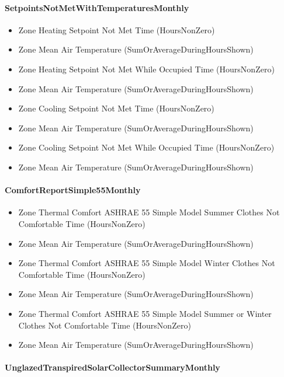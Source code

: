 \paragraph{SetpointsNotMetWithTemperaturesMonthly}\label{setpointsnotmetwithtemperaturesmonthly}

\begin{itemize}
\item
  Zone Heating Setpoint Not Met Time (HoursNonZero)
\item
  Zone Mean Air Temperature (SumOrAverageDuringHoursShown)
\item
  Zone Heating Setpoint Not Met While Occupied Time (HoursNonZero)
\item
  Zone Mean Air Temperature (SumOrAverageDuringHoursShown)
\item
  Zone Cooling Setpoint Not Met Time (HoursNonZero)
\item
  Zone Mean Air Temperature (SumOrAverageDuringHoursShown)
\item
  Zone Cooling Setpoint Not Met While Occupied Time (HoursNonZero)
\item
  Zone Mean Air Temperature (SumOrAverageDuringHoursShown)
\end{itemize}

\paragraph{ComfortReportSimple55Monthly}\label{comfortreportsimple55monthly}

\begin{itemize}
\item
  Zone Thermal Comfort ASHRAE 55 Simple Model Summer Clothes Not Comfortable Time (HoursNonZero)
\item
  Zone Mean Air Temperature (SumOrAverageDuringHoursShown)
\item
  Zone Thermal Comfort ASHRAE 55 Simple Model Winter Clothes Not Comfortable Time (HoursNonZero)
\item
  Zone Mean Air Temperature (SumOrAverageDuringHoursShown)
\item
  Zone Thermal Comfort ASHRAE 55 Simple Model Summer or Winter Clothes Not Comfortable Time (HoursNonZero)
\item
  Zone Mean Air Temperature (SumOrAverageDuringHoursShown)
\end{itemize}

\paragraph{UnglazedTranspiredSolarCollectorSummaryMonthly}\label{unglazedtranspiredsolarcollectorsummarymonthly}

